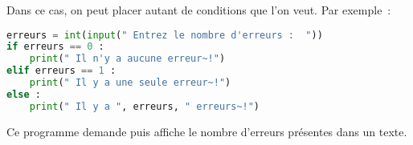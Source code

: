 Dans ce cas, on peut placer autant de conditions que l'on veut.
\newpar
Par exemple~:
\begin{lstlisting}[language=Python]
erreurs = int(input(" Entrez le nombre d'erreurs :  "))
if erreurs == 0 :
    print(" Il n'y a aucune erreur~!")
elif erreurs == 1 :
    print(" Il y a une seule erreur~!")
else :
    print(" Il y a ", erreurs, " erreurs~!")
\end{lstlisting}
Ce programme demande puis affiche le nombre d'erreurs présentes dans un texte.
\par

